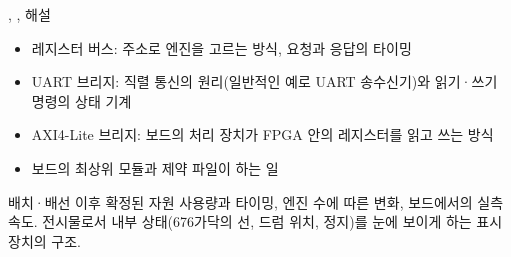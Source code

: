 \begin{todobox}{, ,  해설}
\begin{itemize}
\item 레지스터 버스: 주소로 엔진을 고르는 방식, 요청과 응답의 타이밍
\item UART 브리지: 직렬 통신의 원리(일반적인 예로 UART 송수신기)와 읽기·쓰기 명령의 상태 기계
\item AXI4-Lite 브리지: 보드의 처리 장치가 FPGA 안의 레지스터를 읽고 쓰는 방식
\item 보드의 최상위 모듈과 제약 파일이 하는 일
\end{itemize}
\end{todobox}

\begin{todobox}{배치·배선 이후}
확정된 자원 사용량과 타이밍, 엔진 수에 따른 변화, 보드에서의 실측 속도. 전시물로서 내부 상태(676가닥의 선,
드럼 위치, 정지)를 눈에 보이게 하는 표시 장치의 구조.
\end{todobox}

